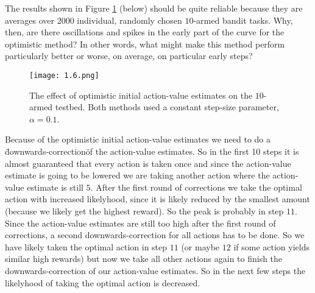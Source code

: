 \begin{exercise}
The results shown in Figure \ref{fig:1.6} (below) should be quite reliable because they are averages over $2000$ individual, randomly chosen $10$-armed bandit tasks.
Why, then, are there oscillations and spikes in the early part of the curve for the optimistic method?
In other words, what might make this method perform particularly better or worse, on average, on particular early steps?

\begin{figure}[H]
    \centering
    \texttt{[image: 1.6.png]}
    \caption
    {
        The effect of optimistic initial action-value estimates on the $10$-armed testbed.
        Both methods used a constant step-size parameter, $\alpha = 0.1$.
    }
    \label{fig:1.6}
\end{figure}
\end{exercise}

\begin{solution}
Because of the optimistic initial action-value estimates we need to do a \"downwards-correction\" of the action-value estimates. So in the first 10 steps it is almost guaranteed that every action is taken once and since the action-value estimate is going to be lowered we are taking another action where the action-value estimate is still $5$. After the first round of corrections we take the optimal action with increased likelyhood, since it is likely reduced by the smallest amount (because we likely get the highest reward). So the peak is probably in step $11$. Since the action-value estimates are still too high after the first round of corrections, a second downwards-correction for all actions has to be done. So we have likely taken the optimal action in step $11$ (or maybe $12$ if some action yields similar high rewards) but now we take all other actions again to finish the downwards-correction of our action-value estimates. So in the next few steps the likelyhood of taking the optimal action is decreased.
\end{solution}

